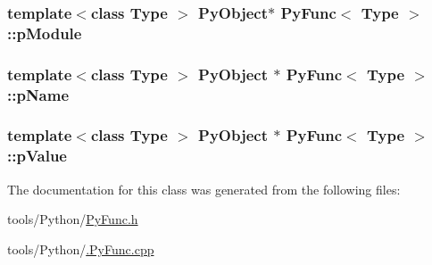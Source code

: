 \hypertarget{classPyFunc_aa87d68b9046b473e3cfeb4a0e08dccf0}{
\subsubsection[{p\-Module}]{\setlength{\rightskip}{0pt plus 5cm}template$<$class Type $>$ Py\-Object$\ast$ {\bf Py\-Func}$<$ Type $>$\-::p\-Module\hspace{0.3cm}{\ttfamily [protected]}}}\label{classPyFunc_aa87d68b9046b473e3cfeb4a0e08dccf0}
\hypertarget{classPyFunc_aee7f0c1f281e63e0d26ff71b9868c086}{
\subsubsection[{p\-Name}]{\setlength{\rightskip}{0pt plus 5cm}template$<$class Type $>$ Py\-Object $\ast$ {\bf Py\-Func}$<$ Type $>$\-::p\-Name\hspace{0.3cm}{\ttfamily [protected]}}}\label{classPyFunc_aee7f0c1f281e63e0d26ff71b9868c086}
\hypertarget{classPyFunc_a3c63064658876c190224c4adc5f5dc07}{
\subsubsection[{p\-Value}]{\setlength{\rightskip}{0pt plus 5cm}template$<$class Type $>$ Py\-Object $\ast$ {\bf Py\-Func}$<$ Type $>$\-::p\-Value\hspace{0.3cm}{\ttfamily [protected]}}}\label{classPyFunc_a3c63064658876c190224c4adc5f5dc07}


The documentation for this class was generated from the following files\-:\begin{DoxyCompactItemize}
\item 
tools/\-Python/\hyperlink{PyFunc_8h}{Py\-Func.\-h}\item 
tools/\-Python/\hyperlink{_8PyFunc_8cpp}{.\-Py\-Func.\-cpp}\end{DoxyCompactItemize}
